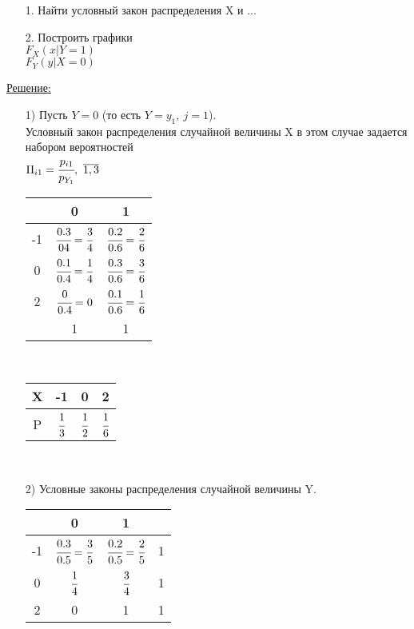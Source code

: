 
\begin{enumerate}
	\item[1.] Найти условный закон распределения X и ...
	\item[2.] Построить графики\\
	$F_X(x|Y = 1)$\\
	$F_Y(y|X = 0)$\\
\end{enumerate}
\underline{Решение:}
\begin{enumerate}
	\item[1)] Пусть $Y = 0$ (то есть $Y = y_1, \ j = 1$).\\
	Условный закон распределения случайной величины X в этом случае задается набором вероятностей\\
	$\Pi_{i1} = \cfrac{p_{i1}}{p_{Y_1}}, \ \overline{1,3}$\\
	
	\begin{tabular}{|c||c|c|}
	\hline 
	 & 0 & 1 \\ 
	\hline \hline
	-1 & $\cfrac{0.3}{04} = \cfrac{3}{4}$ & $\cfrac{0.2}{0.6} = \cfrac{2}{6}$ \\ 
	\hline 
	0 & $\cfrac{0.1}{0.4} = \cfrac{1}{4}$ & $\cfrac{0.3}{0.6} = \cfrac{3}{6}$ \\ 
	\hline 
	2 & $\cfrac{0}{0.4} = 0$ & $\cfrac{0.1}{0.6} = \cfrac{1}{6}$ \\ 
	\hline \hline
	 & 1 & 1 \\ 
	\hline 
	\end{tabular} \\
	
	\begin{tabular}{|c||c|c|c|}
	\hline 
	X & -1 & 0 & 2 \\ 
	\hline 
	P & $\cfrac{1}{3}$ & $\cfrac{1}{2}$ & $\cfrac{1}{6}$ \\ 
	\hline 
	\end{tabular} \\
	
	\item[2)] Условные законы распределения случайной величины Y.\\

	\begin{tabular}{|c||c|c|c|}
	\hline 
	 & 0 & 1 &  \\ 
	\hline 
	\hline
	-1 & $\cfrac{0.3}{0.5} = \cfrac{3}{5}$ & $\cfrac{0.2}{0.5} = \cfrac{2}{5}$ & 1 \\ 
	\hline 
	0 & $\cfrac{1}{4}$ & $\cfrac{3}{4}$ & 1 \\ 
	\hline 
	2 & 0 & 1 & 1 \\ 
	\hline 
	\end{tabular} 


\end{enumerate}

